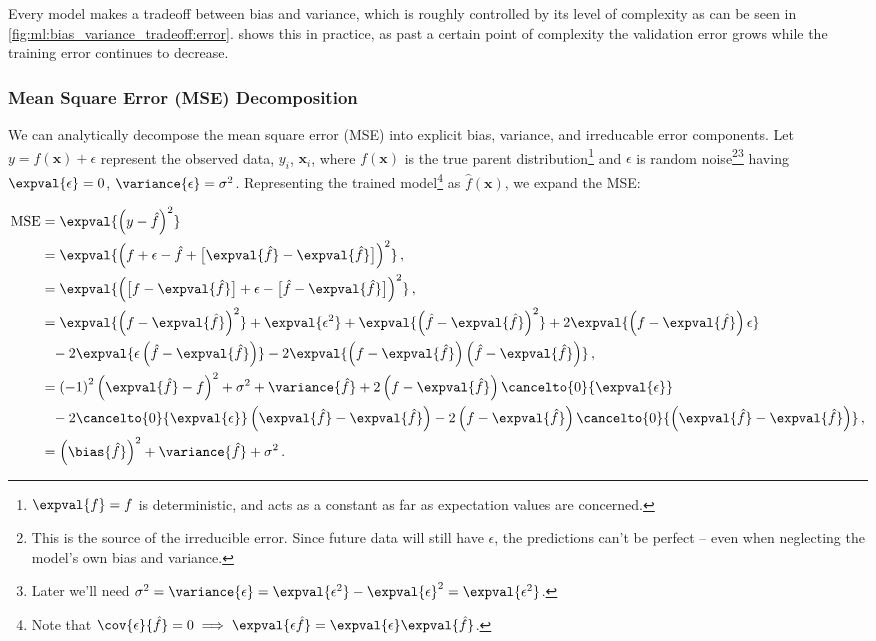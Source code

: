 Every model makes a tradeoff between bias and variance,
which is roughly controlled by its level of complexity
as can be seen in \cref{fig:ml:bias_variance_tradeoff:error}.
 shows this in practice,
as past a certain point of complexity the validation error grows
while the training error continues to decrease.

\subsubsection{Mean Square Error (MSE) Decomposition}
\label{ml_general:bias_variance_tradeoff:decop}

We can analytically decompose the mean square error (MSE) into explicit
bias, variance, and irreducable error components.
Let $y = f\left(\mathbf{x}\right) + \epsilon$ represent
the observed data, $y_{i}$, $\mathbf{x}_{i}$,
where $f\left(\mathbf{x}\right)$ is the true parent distribution\footnote{$\expval{f} = f$ is deterministic,
and acts as a constant as far as expectation values are concerned.} and
$\epsilon$ is random noise\footnote{This is the source of the irreducible error.
Since future data will still have $\epsilon$, the predictions can't be perfect
-- even when neglecting the model's own bias and variance.}\footnote{Later we'll need
$\sigma^{2} = \variance{\epsilon} = \expval{\epsilon^{2}} - \expval{\epsilon}^{2} = \expval{\epsilon^{2}}$.} having
$\expval{\epsilon} = 0$, $\variance{\epsilon} = \sigma^{2}$.
Representing the trained model\footnote{Note
that $\cov{\epsilon}{\hat{f}} = 0 \implies \expval{\epsilon \hat{f}} = \expval{\epsilon} \expval{\hat{f}}$.} as
$\hat{f}\left(\mathbf{x}\right)$, we expand the MSE:

\begin{subequations} \label{eq:bias_variance_tradeoff:decop}
\begin{align}
\text{MSE} &= \expval{\left(y-\hat{f}\right)^{2}} \\
&= \expval{\left(f + \epsilon - \hat{f} + \big[\expval{\hat{f}}-\expval{\hat{f}}\big]\right)^{2}}\,, \\
&= \expval{\left(\big[f - \expval{\hat{f}}\big] + \epsilon - \big[\hat{f} - \expval{\hat{f}}\big]\right)^{2}}\,, \\
&= \expval{\left(f-\expval{\hat{f}}\right)^{2}}
+\expval{\epsilon^{2}}
+\expval{\left(\hat{f}-\expval{\hat{f}}\right)^{2}}
+2\expval{\left(f-\expval{\hat{f}}\right)\epsilon} \\
&\hphantom{=}-2\expval{\epsilon\left(\hat{f}-\expval{\hat{f}}\right)}
-2\expval{\left(f-\expval{\hat{f}}\right)\left(\hat{f}-\expval{\hat{f}}\right)}\,, \\
&= \left(-1\right)^{2}\left(\expval{\hat{f}}-f\right)^{2} +\sigma^{2} + \variance{\hat{f}}
+2\left(f-\expval{\hat{f}}\right)\cancelto{0}{\expval{\epsilon}} \\
&\hphantom{=}-2\cancelto{0}{\expval{\epsilon}}\left(\expval{\hat{f}}-\expval{\hat{f}}\right)
-2\left(f-\expval{\hat{f}}\right)\cancelto{0}{\left(\expval{\hat{f}}-\expval{\hat{f}}\right)}\,, \\
&= \left(\bias{\hat{f}}\right)^{2} + \variance{\hat{f}} + \sigma^{2}\,.
\end{align}
\end{subequations}

